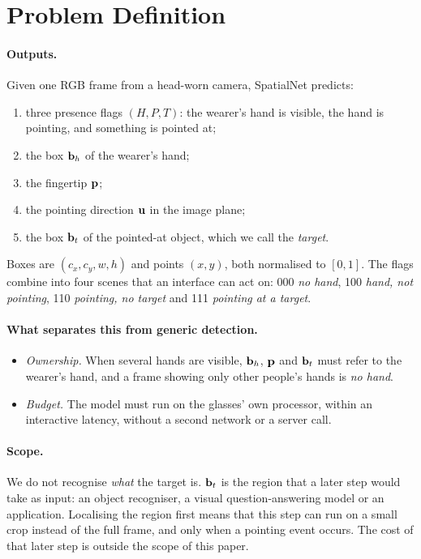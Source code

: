 \section{Problem Definition}\label{sec:problem}

\paragraph{Outputs.} Given one RGB frame from a head-worn camera, SpatialNet predicts:
\begin{enumerate}
\item three presence flags $(H,P,T)$: the wearer's hand is visible, the hand is pointing, and something is pointed at;
\item the box $\mathbf{b}_h$ of the wearer's hand;
\item the fingertip $\mathbf{p}$;
\item the pointing direction $\mathbf{u}$ in the image plane;
\item the box $\mathbf{b}_t$ of the pointed-at object, which we call the \emph{target}.
\end{enumerate}
Boxes are $(c_x,c_y,w,h)$ and points $(x,y)$, both normalised to $[0,1]$. The flags combine into four scenes that an interface can act on: 000 \emph{no hand}, 100 \emph{hand, not pointing}, 110 \emph{pointing, no target} and 111 \emph{pointing at a target}.

\paragraph{What separates this from generic detection.}
\begin{itemize}
\item \emph{Ownership.} When several hands are visible, $\mathbf{b}_h$, $\mathbf{p}$ and $\mathbf{b}_t$ must refer to the wearer's hand, and a frame showing only other people's hands is \emph{no hand}.
\item \emph{Budget.} The model must run on the glasses' own processor, within an interactive latency, without a second network or a server call.
\end{itemize}

\paragraph{Scope.} We do not recognise \emph{what} the target is. $\mathbf{b}_t$ is the region that a later step would take as input: an object recogniser, a visual question-answering model or an application. Localising the region first means that this step can run on a small crop instead of the full frame, and only when a pointing event occurs. The cost of that later step is outside the scope of this paper.
